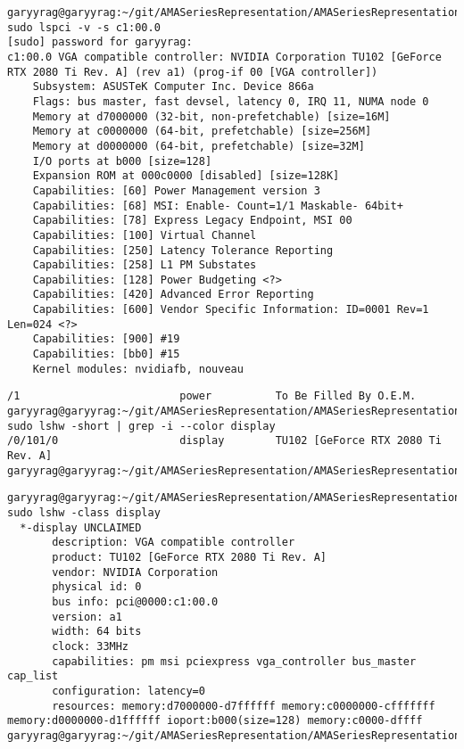 \documentclass[hyperref,idxtotoc]{labbook}
\begin{document}
\begin{verbatim}
garyyrag@garyyrag:~/git/AMASeriesRepresentation/AMASeriesRepresentation$ sudo lspci -v -s c1:00.0
[sudo] password for garyyrag: 
c1:00.0 VGA compatible controller: NVIDIA Corporation TU102 [GeForce RTX 2080 Ti Rev. A] (rev a1) (prog-if 00 [VGA controller])
	Subsystem: ASUSTeK Computer Inc. Device 866a
	Flags: bus master, fast devsel, latency 0, IRQ 11, NUMA node 0
	Memory at d7000000 (32-bit, non-prefetchable) [size=16M]
	Memory at c0000000 (64-bit, prefetchable) [size=256M]
	Memory at d0000000 (64-bit, prefetchable) [size=32M]
	I/O ports at b000 [size=128]
	Expansion ROM at 000c0000 [disabled] [size=128K]
	Capabilities: [60] Power Management version 3
	Capabilities: [68] MSI: Enable- Count=1/1 Maskable- 64bit+
	Capabilities: [78] Express Legacy Endpoint, MSI 00
	Capabilities: [100] Virtual Channel
	Capabilities: [250] Latency Tolerance Reporting
	Capabilities: [258] L1 PM Substates
	Capabilities: [128] Power Budgeting <?>
	Capabilities: [420] Advanced Error Reporting
	Capabilities: [600] Vendor Specific Information: ID=0001 Rev=1 Len=024 <?>
	Capabilities: [900] #19
	Capabilities: [bb0] #15
	Kernel modules: nvidiafb, nouveau

\end{verbatim}

\begin{verbatim}
/1                         power          To Be Filled By O.E.M.
garyyrag@garyyrag:~/git/AMASeriesRepresentation/AMASeriesRepresentation$ sudo lshw -short | grep -i --color display
/0/101/0                   display        TU102 [GeForce RTX 2080 Ti Rev. A]
garyyrag@garyyrag:~/git/AMASeriesRepresentation/AMASeriesRepresentation$ 
\end{verbatim}


\begin{verbatim}
garyyrag@garyyrag:~/git/AMASeriesRepresentation/AMASeriesRepresentation$ sudo lshw -class display
  *-display UNCLAIMED
       description: VGA compatible controller
       product: TU102 [GeForce RTX 2080 Ti Rev. A]
       vendor: NVIDIA Corporation
       physical id: 0
       bus info: pci@0000:c1:00.0
       version: a1
       width: 64 bits
       clock: 33MHz
       capabilities: pm msi pciexpress vga_controller bus_master cap_list
       configuration: latency=0
       resources: memory:d7000000-d7ffffff memory:c0000000-cfffffff memory:d0000000-d1ffffff ioport:b000(size=128) memory:c0000-dffff
garyyrag@garyyrag:~/git/AMASeriesRepresentation/AMASeriesRepresentation$ 
\end{verbatim}
\end{document}
